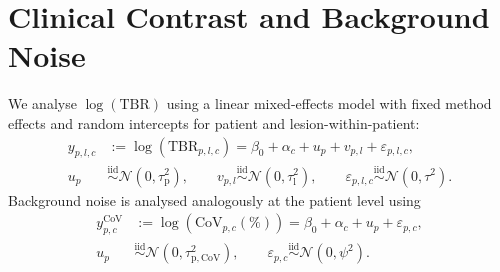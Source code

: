 \section{Clinical Contrast and Background Noise}

We analyse $\log(\mathrm{TBR})$ using a linear mixed-effects model with fixed method effects and random intercepts for patient and lesion-within-patient:
\begin{equation}
\begin{aligned}
y_{p,l,c} &:= \log\!\left(\mathrm{TBR}_{p,l,c}\right)
= \beta_0 + \alpha_c + u_p + v_{p,l} + \varepsilon_{p,l,c},\\
u_p &\overset{\mathrm{iid}}{\sim} \mathcal{N}(0,\tau^2_{\mathrm{p}}),
\qquad
v_{p,l} \overset{\mathrm{iid}}{\sim} \mathcal{N}(0,\tau^2_{\mathrm{l}}),
\qquad
\varepsilon_{p,l,c} \overset{\mathrm{iid}}{\sim} \mathcal{N}(0,\tau^2).
\end{aligned}
\end{equation}
Background noise is analysed analogously at the patient level using
\begin{equation}
\begin{aligned}
y^{\mathrm{CoV}}_{p,c} &:= \log\!\left(\mathrm{CoV}_{p,c}(\%)\right)
= \beta_0 + \alpha_c + u_p + \varepsilon_{p,c},\\
u_p &\overset{\mathrm{iid}}{\sim} \mathcal{N}(0,\tau^2_{\mathrm{p,CoV}}),
\qquad
\varepsilon_{p,c} \overset{\mathrm{iid}}{\sim} \mathcal{N}(0,\psi^2).
\end{aligned}
\end{equation}
